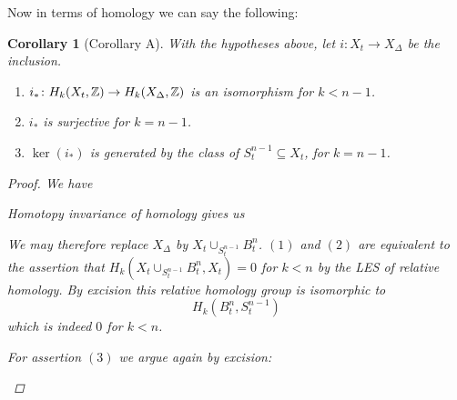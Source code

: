 \documentclass[A4paper, british]{amsart}
\theoremstyle{darkgreentheorem}
\newtheorem{cor}[thm]{Corollary}
\theoremstyle{darkbluedefinition}
\theoremstyle{darkredexample}
\theoremstyle{remark}
\newcommand{\1}{\mathbbm{1}}
\newcommand{\sub}{\subseteq}
\begin{document}
Now in terms of homology we can say the following:

\begin{cor}[Corollary A]
    With the hypotheses above, let $i\colon X_{t}\to X_{\Delta}$ be the inclusion.
    \begin{enumerate}
	\item $i_{*}\colon H_{k}(X_{t},\mathbb{Z})\to H_{k}(X_{\Delta},\mathbb{Z})$ is an isomorphism for $k<n-1$.
	\item $i_{*}$ is surjective for $k=n-1$.
	\item $\ker(i_{*})$ is generated by the class of $S_{t}^{n-1}\sub X_{t}$, for $k=n-1$.
    \end{enumerate}
    \begin{proof}
	We have
	\begin{center}
	\end{center}
	Homotopy invariance of homology gives us
	\begin{center}
	\end{center}
	We may therefore replace $X_{\Delta}$ by $X_{t}\cup_{S_{t}^{n-1}}B^{n}_{t}$.
	$(1)$ and $(2)$ are equivalent to the assertion that $H_{k}(X_{t}\cup_{S_{t}^{n-1}}B^{n}_{t},X_{t})=0$ for $k<n$ by the LES of relative homology.
	By excision this relative homology group is isomorphic to
	\[ H_{k}(B_{t}^{n},S_{t}^{n-1}) \]
	which is indeed $0$ for $k<n$.

	For assertion $(3)$ we argue again by excision:
	\begin{center}
	\end{center}
    \end{proof}
\end{cor}
\end{document}
